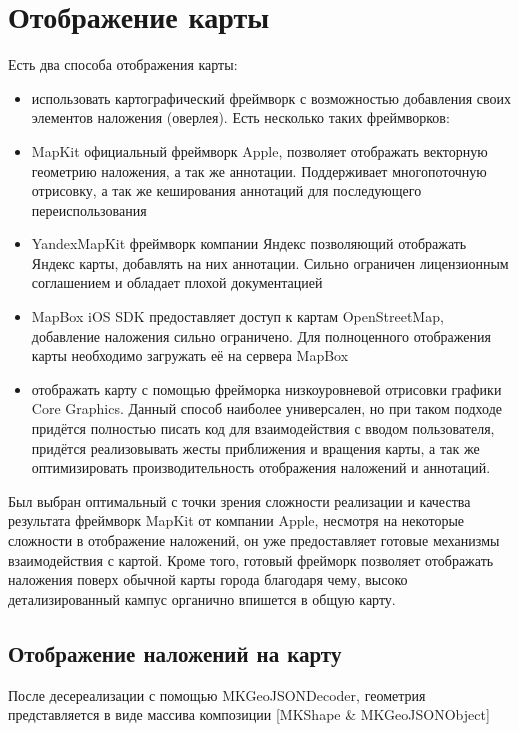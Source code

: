   \section{Отображение карты}
    Есть два способа отображения карты:
    \begin{itemize}
      \item использовать картографический фреймворк с возможностью добавления своих элементов наложения (оверлея). Есть несколько таких фреймворков:
      \item MapKit официальный фреймворк Apple, позволяет отображать векторную геометрию наложения, а так же аннотации. Поддерживает многопоточную отрисовку, а так же кеширования аннотаций для последующего переиспользования
      \item YandexMapKit фреймворк компании Яндекс позволяющий отображать Яндекс карты, добавлять на них аннотации. Сильно ограничен лицензионным соглашением и обладает плохой документацией
      \item MapBox iOS SDK предоставляет доступ к картам OpenStreetMap, добавление наложения сильно ограничено. Для полноценного отображения карты необходимо загружать её на сервера MapBox
      \item отображать карту с помощью фрейморка низкоуровневой отрисовки графики Core Graphics. Данный способ наиболее универсален, но при таком подходе придётся полностью писать код для взаимодействия с вводом пользователя, придётся реализовывать жесты приближения и вращения карты, а так же оптимизировать производительность отображения наложений и аннотаций.
    \end{itemize}


    Был выбран оптимальный с точки зрения сложности реализации и качества результата фреймворк MapKit от компании Apple, несмотря на некоторые сложности в отображение наложений, он уже предоставляет готовые механизмы взаимодействия с картой. Кроме того, готовый фрейморк позволяет отображать наложения поверх обычной карты города благодаря чему, высоко детализированный кампус органично впишется в общую карту.

    \subsection{Отображение наложений на карту}
      После десереализации с помощью MKGeoJSONDecoder, геометрия представляется в виде массива композиции [MKShape \& MKGeoJSONObject]


